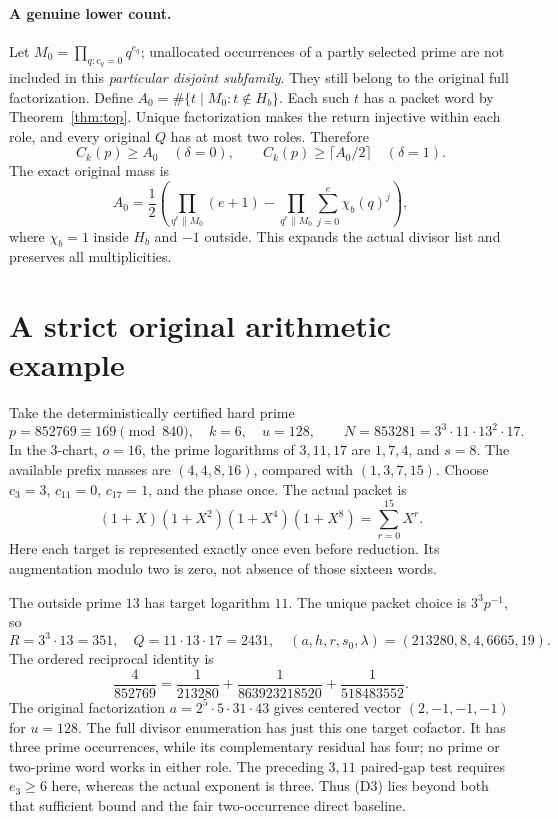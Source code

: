 \paragraph{A genuine lower count.}
Let $M_0=\prod_{q:c_q=0}q^{e_q}$; unallocated occurrences of a partly selected
prime are not included in this \emph{particular disjoint subfamily}.
They still belong to the original full factorization. Define
$A_0=\#\{t\mid M_0:t\notin H_b\}$.
Each such $t$ has a packet word by Theorem~\ref{thm:top}.
Unique factorization makes the return injective within each role, and every
original $Q$ has at most two roles. Therefore
\[
 \boxed{C_k(p)\ge A_0\quad(\delta=0),\qquad
 C_k(p)\ge\lceil A_0/2\rceil\quad(\delta=1).}              \tag{C1}
\]
The exact original mass is
\[
 A_0=\frac12\left(
 \prod_{q^e\parallel M_0}(e+1)-
 \prod_{q^e\parallel M_0}\sum_{j=0}^e\chi_b(q)^j\right),   \tag{C2}
\]
where $\chi_b=1$ inside $H_b$ and $-1$ outside. This expands the actual
divisor list and preserves all multiplicities.

\section{A strict original arithmetic example}
Take the deterministically certified hard prime
\[
 p=852769\equiv169\pmod{840},\quad k=6,\quad u=128,
 \qquad N=853281=3^3\cdot11\cdot13^2\cdot17.              \tag{D1}
\]
In the $3$-chart, $o=16$, the prime logarithms of $3,11,17$ are $1,7,4$,
and $s=8$. The available prefix masses are $(4,4,8,16)$, compared with
$(1,3,7,15)$. Choose $c_3=3$, $c_{11}=0$, $c_{17}=1$, and the phase once.
The actual packet is
\[
 (1+X)(1+X^2)(1+X^4)(1+X^8)=\sum_{r=0}^{15}X^r.           \tag{D2}
\]
Here each target is represented exactly once even before reduction. Its
augmentation modulo two is zero, not absence of those sixteen words.

The outside prime $13$ has target logarithm $11$. The unique packet choice
is $3^3p^{-1}$, so
\[
 R=3^3\cdot13=351,\quad Q=11\cdot13\cdot17=2431,
 \quad(a,h,r,s_0,\lambda)=(213280,8,4,6665,19).
\]
The ordered reciprocal identity is
\[
 \boxed{\frac4{852769}=
 \frac1{213280}+\frac1{863923218520}+\frac1{518483552}.}     \tag{D3}
\]
The original factorization $a=2^5\cdot5\cdot31\cdot43$ gives centered
vector $(2,-1,-1,-1)$ for $u=128$.
The full divisor enumeration has just this one target cofactor.
It has three prime occurrences, while its complementary residual has four;
no prime or two-prime word works in either role.
The preceding $3,11$ paired-gap test requires $e_3\ge6$ here, whereas the
actual exponent is three. Thus (D3) lies beyond both that sufficient bound
and the fair two-occurrence direct baseline.

